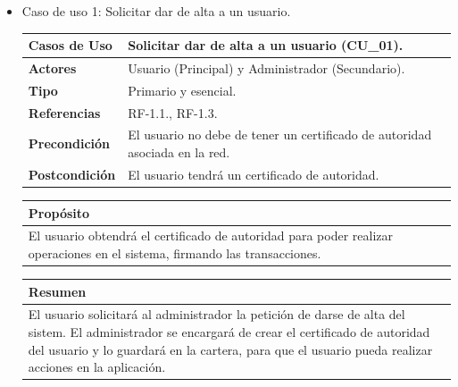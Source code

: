 \begin{itemize}
    \item Caso de uso 1: Solicitar dar de alta a un usuario.
    
    \begin{table}[h!]
        \centering
        \begin{tabular}{|l|p{}|}
            \hline
            \textbf{Casos de Uso}   &   Solicitar dar de alta a un usuario (CU\_01). \\
            \hline 
            \textbf{Actores}        &   Usuario (Principal) y Administrador (Secundario). \\ 
            \hline 
            \textbf{Tipo}           &   Primario y esencial. \\
            \hline
            \textbf{Referencias}    &   RF-1.1., RF-1.3. \\ 
            \hline
            \textbf{Precondición}   &   El usuario no debe de tener un certificado de autoridad asociada en la red. \\ 
            \hline
            \textbf{Postcondición}  &   El usuario tendrá un certificado de autoridad. \\ 
            \hline
        \end{tabular}
        
        \vspace{5mm}
        
        \begin{tabular}{|p{\textwidth}|}
            \hline
            \rowcolor{SeaGreen} \textbf{Propósito} \\
            \hline
            \multicolumn{1}{|p{12cm}|}{El usuario obtendrá el certificado de autoridad para poder realizar operaciones en 
            el sistema, firmando las transacciones.} \\ [0.5ex]
            \hline
        \end{tabular}
        
        \vspace{5mm}
        
        \begin{tabular}{|p{\textwidth}|}
            \hline
            \rowcolor{SeaGreen} \textbf{Resumen} \\
            \hline
            \multicolumn{1}{|p{12cm}|}{El usuario solicitará al administrador la petición de darse de alta del sistem. El 
            administrador se encargará de crear el certificado de autoridad del usuario y lo guardará en la cartera, para 
            que el usuario pueda realizar acciones en la aplicación.} \\ [0.5ex]
            \hline
        \end{tabular}
        

\end{table}
\end{itemize}

